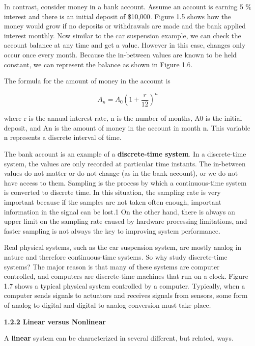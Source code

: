 \documentclass[12pt]{article}
\begin{document}
In contrast, consider money in a bank account. Assume an account is
earning 5 \% interest and there is an initial deposit of \$10,000. Figure 1.5
shows how the money would grow if no deposits or withdrawals are made
and the bank applied interest monthly. Now similar to the car suspension
example, we can check the account balance at any time and get a value.
However in this case, changes only occur once every month. Because the
in-between values are known to be held constant, we can represent the
balance as shown in Figure 1.6.

The formula for the amount of money in the account is

\[
A_n = A_0 \left (1 + \frac{r}{12} \right )^n
\]

where r is the annual interest rate, n is the number of months, A0 is the
initial deposit, and An is the amount of money in the account in month
n. This variable n represents a discrete interval of time.

The bank account is an example of a \textbf{discrete-time system}. In a
discrete-time system, the values are only recorded at particular time instants.
The in-between values do not matter or do not change (as in the bank
account), or we do not have access to them. Sampling is the process by
which a continuous-time system is converted to discrete time. In this situation,
the sampling rate is very important because if the samples are not
taken often enough, important information in the signal can be lost.1 On
the other hand, there is always an upper limit on the sampling rate caused
by hardware processing limitations, and faster sampling is not always the
key to improving system performance.

Real physical systems, such as the car suspension system, are mostly
analog in nature and therefore continuous-time systems. So why study
discrete-time systems? The major reason is that many of these systems are
computer controlled, and computers are discrete-time machines that run on
a clock. Figure 1.7 shows a typical physical system controlled by a computer.
Typically, when a computer sends signals to actuators and receives
signals from sensors, some form of analog-to-digital and digital-to-analog
conversion must take place.

\hfill

\textbf{1.2.2 Linear versus Nonlinear}

\hfill

A \textbf{linear} system can be characterized in several different, but related, ways.
\end{document}

